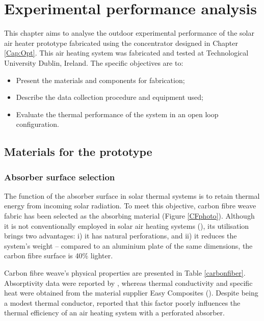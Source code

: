 \chapter{Experimental performance analysis}
\label{Cap:Exp}
%

This chapter aims to analyse the outdoor experimental performance of the solar air heater prototype fabricated using the concentrator designed in Chapter \ref{Cap:Opt}. This air heating system was fabricated and tested at Technological University Dublin, Ireland. The specific objectives are to:

\begin{itemize}
	\item Present the materials and components for fabrication;
	\item Describe the data collection procedure and equipment used;
	\item Evaluate the thermal performance of the system in an open loop configuration.
\end{itemize}

\section{Materials for the prototype}
	
\subsection{Absorber surface selection}

The function of the absorber surface in solar thermal systems is to retain thermal energy from incoming solar radiation. To meet this objective, carbon fibre weave fabric has been selected as the absorbing material (Figure \ref{CFphoto}). Although it is not conventionally employed in solar air heating systems (\cite{Shams2013}), its utilisation brings two advantages: i) it has natural perforations, and ii) it reduces the system's weight -- compared to an aluminium plate of the same dimensions, the carbon fibre surface is 40\% lighter.


\newpage
Carbon fibre weave's physical properties are presented in Table \ref{carbonfiber}. Absorptivity data were reported by \citet{Wu2012}, whereas thermal conductivity and specific heat were obtained from the material supplier Easy Composites (\cite{EasyComposites2017}). Despite being a modest thermal conductor, \citet{Gawlik2005} reported that this factor poorly influences the thermal efficiency of an air heating system with a perforated absorber.

